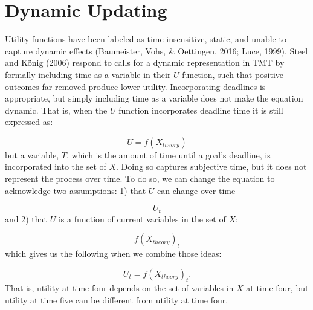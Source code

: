 \documentclass[english,,man]{apa6}
\theoremstyle{definition}
\theoremstyle{definition}
\theoremstyle{definition}
\theoremstyle{remark}
\begin{document}
\hypertarget{dynamic-updating}{%
\section{Dynamic Updating}\label{dynamic-updating}}

Utility functions have been labeled as time insensitive, static, and
unable to capture dynamic effects (Baumeister, Vohs, \& Oettingen, 2016;
Luce, 1999). Steel and König (2006) respond to calls for a dynamic
representation in TMT by formally including time as a variable in their
\(U\) function, such that positive outcomes far removed produce lower
utility. Incorporating deadlines is appropriate, but simply including
time as a variable does not make the equation dynamic. That is, when the
\(U\) function incorporates deadline time it is still expressed as:

\begin{equation}
U = f(X_{theory})
\end{equation} \noindent but a variable, \(T\), which is the amount of
time until a goal's deadline, is incorporated into the set of \(X\).
Doing so captures subjective time, but it does not represent the process
over time. To do so, we can change the equation to acknowledge two
assumptions: 1) that \(U\) can change over time

\begin{equation}
U_{t}
\end{equation} \noindent and 2) that \(U\) is a function of current
variables in the set of \(X\):

\begin{equation}
f(X_{theory})_{t}
\end{equation} \noindent which gives us the following when we combine
those ideas:

\begin{equation}
U_{t} = f(X_{theory})_{t}.
\end{equation} \noindent That is, utility at time four depends on the
set of variables in \(X\) at time four, but utility at time five can be
different from utility at time four.
\end{document}
